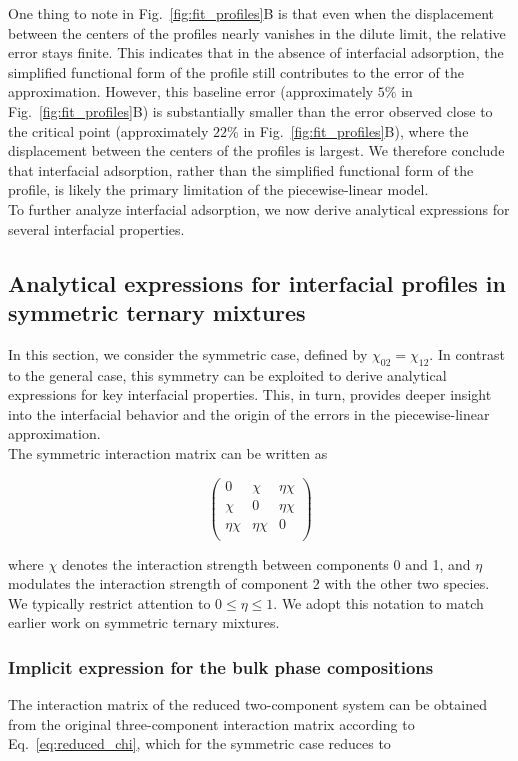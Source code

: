 \documentclass[12pt]{article}
\begin{document}
One thing to note in Fig.~\ref{fig:fit_profiles}B is that even when the displacement between the centers of the profiles nearly vanishes in the dilute limit, the relative error stays finite.
This indicates that in the absence of interfacial adsorption, the simplified functional form of the profile still contributes to the error of the approximation. However, this baseline error (approximately \(5\%\) in Fig.~\ref{fig:fit_profiles}B) is substantially smaller than the error observed close to the critical point (approximately \(22\%\) in Fig.~\ref{fig:fit_profiles}B), where the displacement between the centers of the profiles is largest.
We therefore conclude that interfacial adsorption, rather than the
simplified functional form of the profile, is likely the primary limitation of the
piecewise-linear model.\\
To further analyze interfacial adsorption, we now derive analytical expressions for several interfacial properties.

\subsection{Analytical expressions for interfacial profiles in symmetric ternary mixtures}\label{sec:symmetric_case}
In this section, we consider the symmetric case, defined by \(\chi_{02}=\chi_{12}\).
In contrast to the general case, this symmetry can be exploited to derive analytical expressions for key interfacial properties.
This, in turn, provides deeper insight into the interfacial behavior and the origin of the errors in the piecewise-linear approximation.\\
The symmetric interaction matrix can be written as

\[
    \begin{pmatrix}
        0 & \chi& \eta\chi\\
         \chi& 0&  \eta\chi\\
        \eta\chi & \eta\chi& 0\\

    \end{pmatrix}
\]

where \(\chi\) denotes the interaction strength between components 0 and 1, and \(\eta\) modulates the interaction strength of component 2 with the other two species. We typically restrict attention to \(0 \le \eta \le 1\).
We adopt this notation to match earlier work \cite{Huang1996,Huang1996AnalyticInterface,Huang1999} on symmetric ternary mixtures.


\subsubsection{Implicit expression for the bulk phase compositions}
The interaction matrix of the reduced two-component system can be obtained from the original three-component interaction matrix according to Eq.~\eqref{eq:reduced_chi}, which for the symmetric case reduces to\\
\end{document}
